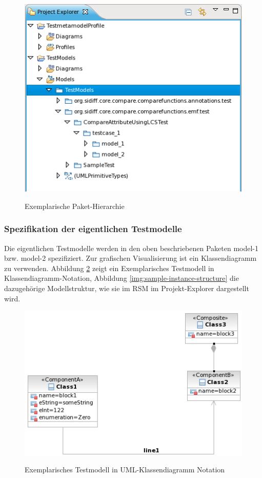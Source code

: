 \begin{figure}
	\centering
 	\includegraphics[scale=0.8]{img/package-hierarchie.png}
	\label{img:package-hierarchie}
	\caption{Exemplarische Paket-Hierarchie}
\end{figure}

\subsubsection{Spezifikation der eigentlichen Testmodelle}
Die eigentlichen Testmodelle werden in den oben beschriebenen Paketen model-1 bzw. model-2 spezifiziert. Zur grafischen Visualisierung ist ein Klassendiagramm zu verwenden. Abbildung \ref{img:sample-instance} zeigt ein Exemplarisches Testmodell in Klassendiagramm-Notation, Abbildung \ref{img:sample-instance-structure} die dazugehörige Modellstruktur, wie sie im RSM im Projekt-Explorer dargestellt wird. 

\begin{figure}
	\centering
 	\includegraphics[scale=0.8]{img/sample-instance.png}
	\label{img:sample-instance}
	\caption{Exemplarisches Testmodell in UML-Klassendiagramm Notation}
\end{figure}

